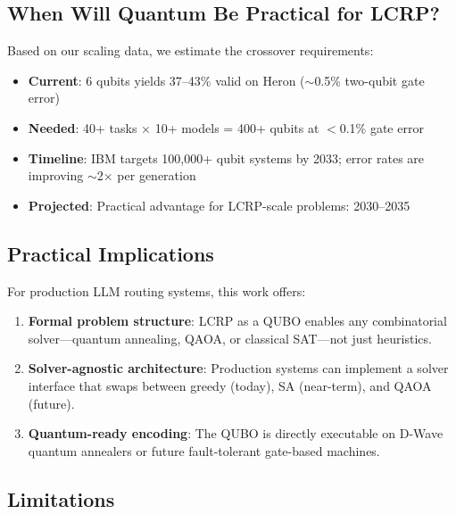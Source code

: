 \documentclass[conference]{IEEEtran}
\begin{document}
\subsection{When Will Quantum Be Practical for LCRP?}

Based on our scaling data, we estimate the crossover requirements:

\begin{itemize}
    \item \textbf{Current}: 6 qubits yields 37--43\% valid on Heron ($\sim$0.5\% two-qubit gate error)
    \item \textbf{Needed}: 40+ tasks $\times$ 10+ models = 400+ qubits at $<$0.1\% gate error
    \item \textbf{Timeline}: IBM targets 100,000+ qubit systems by 2033; error rates are improving $\sim$2$\times$ per generation
    \item \textbf{Projected}: Practical advantage for LCRP-scale problems: 2030--2035
\end{itemize}

\subsection{Practical Implications}

For production LLM routing systems, this work offers:

\begin{enumerate}
    \item \textbf{Formal problem structure}: LCRP as a QUBO enables any combinatorial solver---quantum annealing, QAOA, or classical SAT---not just heuristics.
    \item \textbf{Solver-agnostic architecture}: Production systems can implement a solver interface that swaps between greedy (today), SA (near-term), and QAOA (future).
    \item \textbf{Quantum-ready encoding}: The QUBO is directly executable on D-Wave quantum annealers or future fault-tolerant gate-based machines.
\end{enumerate}

\subsection{Limitations}
\end{document}
